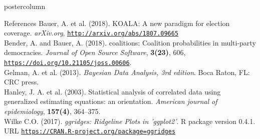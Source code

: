 \documentclass[final,hyperref={pdfpagelabels=false}]{beamer}
\begin{document}
\begin{frame}
\begin{columns}
\begin{column}{1\textwidth}
\vspace{12px}
\begin{beamercolorbox}[center,wd=\textwidth]{postercolumn}
\begin{minipage}[T]{.95\textwidth}  %
\begin{block}{\footnotesize References}
{\footnotesize
Bauer, A. et al. (2018). KOALA: A new paradigm for election coverage.
\textit{arXiv.org}, \href{http://arxiv.org/abs/1807.09665}{\texttt{http://arxiv.org/abs/1807.09665}} \\
Bender, A. and Bauer, A. (2018). coalitions: Coalition probabilities in multi-party democracies.
\textit{Journal of Open Source Software}, \textbf{3(23)}, 606,
\href{https://doi.org/10.21105/joss.00606}{\texttt{https://doi.org/10.21105/joss.00606}}. \\
Gelman, A. et al. (2013). \textit{Bayesian Data Analysis, 3rd edition}. Boca Raton, FL: CRC press. \\
Hanley, J. A. et al. (2003). Statistical analysis of correlated data using generalized
estimating equations: an orientation. \textit{American journal of epidemiology},
\textbf{157(4)}, 364--375. \\
Wilke C.O. (2017). \textit{ggridges: Ridgeline Plots in 'ggplot2'}. R package version
0.4.1. URL \href{https://CRAN.R-project.org/package=ggridges}{\texttt{https://CRAN.R-project.org/package=ggridges}}
}
\end{block}
\end{minipage}
\end{beamercolorbox}

\end{column} %
\end{columns}
\end{frame}
\end{document}
